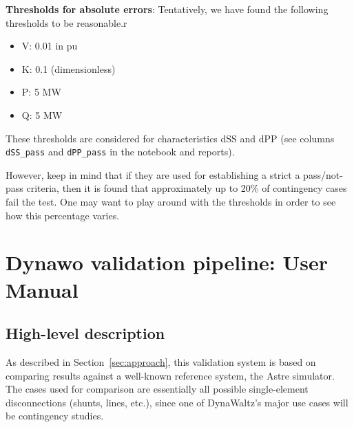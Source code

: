 \documentclass[11pt, a4paper, twoside, titlepage]{article}
\newcommand{\code}[1]{\texttt{#1}}
\begin{document}
\noindent \textbf{Thresholds for absolute errors}: Tentatively, we
have found the following thresholds to be reasonable.r
\begin{itemize}
\item V: 0.01 in pu
\item K: 0.1 (dimensionless)
\item P: 5 MW
\item Q: 5 MW
\end{itemize}

These thresholds are considered for characteristics dSS and dPP (see
columns \code{dSS\_pass} and \code{dPP\_pass} in the notebook and
reports).

However, keep in mind that if they are used for establishing a strict
a pass/not-pass criteria, then it is found that approximately up to
20\% of contingency cases fail the test. One may want to play around
with the thresholds in order to see how this percentage varies.





\section{Dynawo validation pipeline: User Manual}
\label{sec:usermanual}

\subsection{High-level description}
\label{subsec:hl_intro}
As described in Section~\ref{sec:approach}, this validation system is
based on comparing results against a well-known reference system, the
Astre simulator. The cases used for comparison are essentially all
possible single-element disconnections (shunts, lines, etc.), since
one of DynaWaltz's major use cases will be contingency studies.
\end{document}
